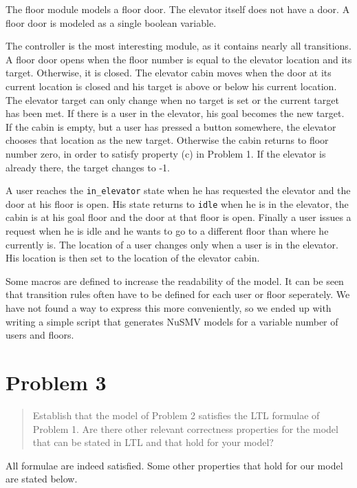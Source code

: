 \documentclass[a4paper,10pt]{article}
\begin{document}
	The floor module models a floor door. The elevator itself does not have a door. A floor door is modeled as a single boolean variable.
	
	The controller is the most interesting module, as it contains nearly all transitions. A floor door opens when the floor number is equal to the elevator location and its target. Otherwise, it is closed. The elevator cabin moves when the door at its current location is closed and his target is above or below his current location. The elevator target can only change when no target is set or the current target has been met. If there is a user in the elevator, his goal becomes the new target. If the cabin is empty, but a user has pressed a button somewhere, the elevator chooses that location as the new target. Otherwise the cabin returns to floor number zero, in order to satisfy property (c) in Problem 1. If the elevator is already there, the target changes to -1.
	
	A user reaches the \texttt{in\_elevator} state when he has requested the elevator and the door at his floor is open. His state returns to \texttt{idle} when he is in the elevator, the cabin is at his goal floor and the door at that floor is open. Finally a user issues a request when he is idle and he wants to go to a different floor than where he currently is. The location of a user changes only when a user is in the elevator. His location is then set to the location of the elevator cabin.
	
	Some macros are defined to increase the readability of the model. It can be seen that transition rules often have to be defined for each user or floor seperately. We have not found a way to express this more conveniently, so we ended up with writing a simple script that generates NuSMV models for a variable number of users and floors.
	
	\section{Problem 3}
	
	\begin{quote}
		Establish that the model of Problem 2 satisfies the LTL formulae of Problem 1. Are there other relevant correctness properties for the model that can be stated in LTL and that hold for your model?
	\end{quote}
	
	All formulae are indeed satisfied. Some other properties that hold for our model are stated below.
	
\end{document}
